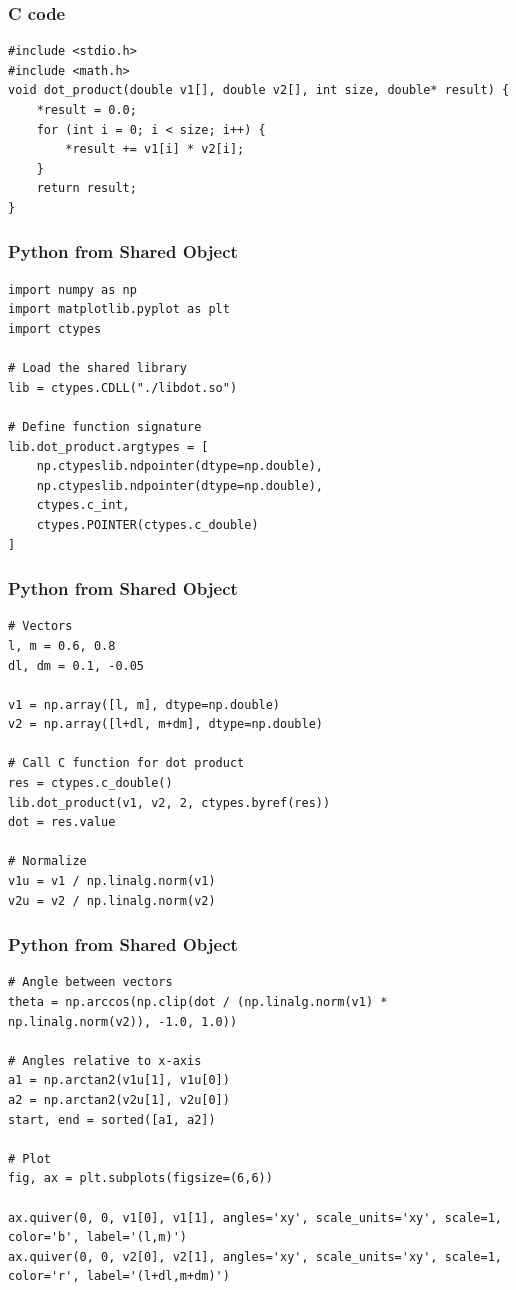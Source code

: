 \documentclass{beamer}
\begin{document}
\begin{frame}[fragile]
\frametitle{C code}
\begin{lstlisting}
#include <stdio.h>
#include <math.h>
void dot_product(double v1[], double v2[], int size, double* result) {
    *result = 0.0;
    for (int i = 0; i < size; i++) {
        *result += v1[i] * v2[i];
    }
    return result;
}
\end{lstlisting}
\end{frame}
\begin{frame}[fragile]
\frametitle{Python from Shared Object}
\begin{lstlisting}
import numpy as np
import matplotlib.pyplot as plt
import ctypes

# Load the shared library
lib = ctypes.CDLL("./libdot.so")

# Define function signature
lib.dot_product.argtypes = [
    np.ctypeslib.ndpointer(dtype=np.double),
    np.ctypeslib.ndpointer(dtype=np.double),
    ctypes.c_int,
    ctypes.POINTER(ctypes.c_double)
]
\end{lstlisting}
\end{frame}
\begin{frame}[fragile]
\frametitle{Python from Shared Object}
\begin{lstlisting}
# Vectors
l, m = 0.6, 0.8
dl, dm = 0.1, -0.05

v1 = np.array([l, m], dtype=np.double)
v2 = np.array([l+dl, m+dm], dtype=np.double)

# Call C function for dot product
res = ctypes.c_double()
lib.dot_product(v1, v2, 2, ctypes.byref(res))
dot = res.value

# Normalize
v1u = v1 / np.linalg.norm(v1)
v2u = v2 / np.linalg.norm(v2)
\end{lstlisting}
\end{frame}
\begin{frame}[fragile]
\frametitle{Python from Shared Object}
\begin{lstlisting}
# Angle between vectors
theta = np.arccos(np.clip(dot / (np.linalg.norm(v1) * np.linalg.norm(v2)), -1.0, 1.0))

# Angles relative to x-axis
a1 = np.arctan2(v1u[1], v1u[0])
a2 = np.arctan2(v2u[1], v2u[0])
start, end = sorted([a1, a2])

# Plot
fig, ax = plt.subplots(figsize=(6,6))

ax.quiver(0, 0, v1[0], v1[1], angles='xy', scale_units='xy', scale=1, color='b', label='(l,m)')
ax.quiver(0, 0, v2[0], v2[1], angles='xy', scale_units='xy', scale=1, color='r', label='(l+dl,m+dm)')
\end{lstlisting}
\end{frame}
\end{document}
